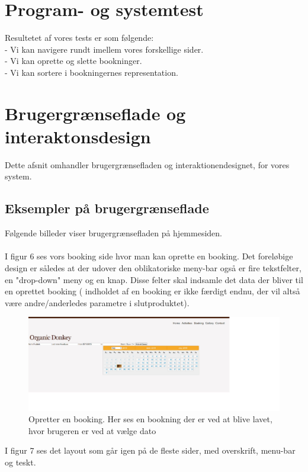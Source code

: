 \documentclass[12pt,a4paper]{article}
\begin{document}
\section{Program- og systemtest}
Resultetet af vores tests er som følgende:\\
- Vi kan navigere rundt imellem vores forskellige sider.\\
- Vi kan oprette og slette bookninger.\\
- Vi kan sortere i bookningernes representation.
\newpage
\section{Brugergrænseflade og interaktonsdesign}
Dette afsnit omhandler brugergrænsefladen og interaktionendesignet, for vores system. 
\subsection{Eksempler på brugergrænseflade}
Følgende billeder viser brugergrænsefladen på hjemmesiden.\\\\
I figur 6 ses vors booking side hvor man kan oprette en booking. 
Det foreløbige design er således at der udover den oblikatoriske meny-bar 
også er fire tekstfelter, en "drop-down" meny og en knap.
Disse felter skal indsamle det data der bliver til en oprettet booking 
( indholdet af en booking er ikke færdigt endnu, 
der vil altså være andre/anderledes parametre i slutproduktet). 
\begin{figure}[H]
\centering
\includegraphics[scale=0.5] {brugergransefladebilled1.jpg}
\caption{Opretter en booking. Her ses en bookning der er ved at blive lavet, hvor brugeren er ved at vælge dato}
\end{figure}
\newpage
I figur 7 ses det layout som går igen på de fleste sider,
 med overskrift, menu-bar og teskt.
\end{document}
